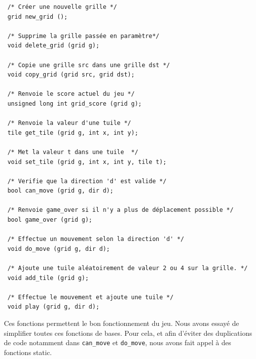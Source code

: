 \documentclass[a4paper]{article}
\begin{document}
 \begin{verbatim}
 /* Créer une nouvelle grille */
 grid new_grid ();

 /* Supprime la grille passée en paramètre*/
 void delete_grid (grid g); 

 /* Copie une grille src dans une grille dst */
 void copy_grid (grid src, grid dst);

 /* Renvoie le score actuel du jeu */
 unsigned long int grid_score (grid g);

 /* Renvoie la valeur d'une tuile */ 
 tile get_tile (grid g, int x, int y); 

 /* Met la valeur t dans une tuile  */
 void set_tile (grid g, int x, int y, tile t);

 /* Verifie que la direction 'd' est valide */ 
 bool can_move (grid g, dir d); 

 /* Renvoie game_over si il n'y a plus de déplacement possible */
 bool game_over (grid g);

 /* Effectue un mouvement selon la direction 'd' */
 void do_move (grid g, dir d);

 /* Ajoute une tuile aléatoirement de valeur 2 ou 4 sur la grille. */
 void add_tile (grid g); 

 /* Effectue le mouvement et ajoute une tuile */
 void play (grid g, dir d);
 \end{verbatim}

 \vspace{0.5cm}
 Ces fonctions permettent le bon fonctionnement du jeu.  
 Nous avons essayé de simplifier toutes ces fonctions de bases. Pour
 cela, et afin d'éviter des duplications de code notamment dans
 \texttt{can\_move} et \texttt{do\_move}, nous avons fait appel à des fonctions static.

 \newpage
\end{document}
